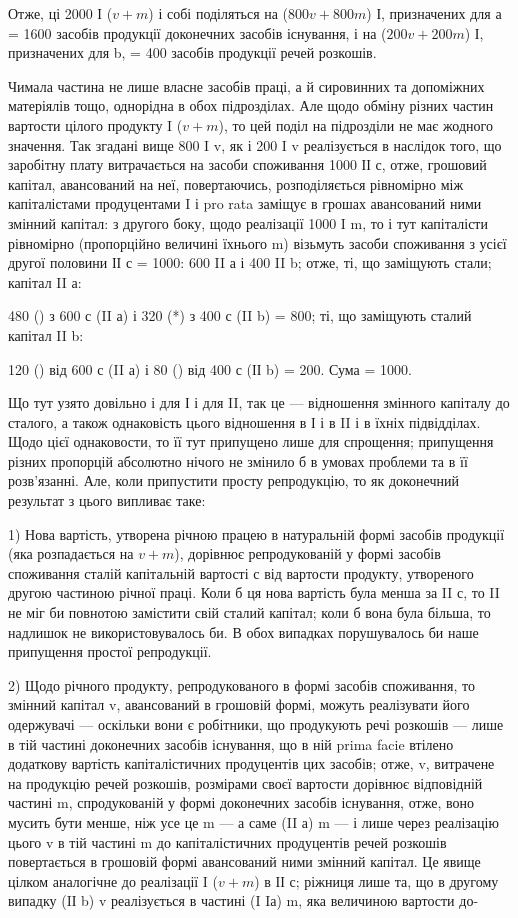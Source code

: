Отже, ці 2000 І ($v + m$) і собі поділяться на ($800 v + 800 m$) І,
призначених для а = 1600 засобів продукції доконечних засобів існування,
і на ($200 v + 200 m$) І, призначених для b, = 400 засобів продукції
речей розкошів.

Чимала частина не лише власне засобів праці, а й сировинних та
допоміжних матеріялів тощо, однорідна в обох підрозділах. Але щодо
обміну різних частин вартости цілого продукту I ($v + m$), то цей поділ
на підрозділи не має жодного значення. Так згадані вище 800 I v, як і
200 I v реалізується в наслідок того, що заробітну плату витрачається
на засоби споживання 1000 ІІ с, отже, грошовий капітал, авансований на
неї, повертаючись, розподіляється рівномірно між капіталістами продуцентами
I і pro rata заміщує в грошах авансований ними змінний капітал:
з другого боку, щодо реалізації 1000 I m, то і тут капіталісти рівномірно
(пропорційно величині їхнього m) візьмуть засоби споживання з
усієї другої половини ІІ с = 1000: 600 II а і 400 II b; отже, ті, що заміщують
стали; капітал II а:

480 () з 600 с (II а) і 320 (*) з 400 с (II b) = 800; ті, що заміщують
сталий капітал II b:

120 () від 600 с (II а) і 80 () від 400 с (ІІ b) = 200. Сума = 1000.

Що тут узято довільно і для І і для II, так це — відношення змінного
капіталу до сталого, а також однаковість цього відношення в
І і в II і в їхніх підвідділах. Щодо цієї однаковости, то її тут припущено
лише для спрощення; припущення різних пропорцій абсолютно нічого
не змінило б в умовах проблеми та в її розв’язанні. Але, коли припустити
просту репродукцію, то як доконечний результат з цього випливає таке:

1) Нова вартість, утворена річною працею в натуральній формі засобів
продукції (яка розпадається на $v + m$), дорівнює репродукованій
у формі засобів споживання сталій капітальній вартості с від вартости
продукту, утвореного другою частиною річної праці. Коли б ця нова вартість
була менша за II с, то II не міг би повнотою замістити свій сталий капітал;
коли б вона була більша, то надлишок не використовувалось би. В
обох випадках порушувалось би наше припущення простої репродукції.

2) Щодо річного продукту, репродукованого в формі засобів споживання,
то змінний капітал v, авансований в грошовій формі, можуть реалізувати
його одержувачі — оскільки вони є робітники, що продукують
речі розкошів — лише в тій частині доконечних засобів існування, що в
ній prima facie втілено додаткову вартість капіталістичних продуцентів
цих засобів; отже, v, витрачене на продукцію речей розкошів, розмірами
своєї вартости дорівнює відповідній частині m, спродукованій у
формі доконечних засобів існування, отже, воно мусить бути менше, ніж
усе це m — а саме (II а) m — і лише через реалізацію цього v в тій частині
m до капіталістичних продуцентів речей розкошів повертається в грошовій
формі авансований ними змінний капітал. Це явище цілком аналогічне
до реалізації I ($v + m$) в ІІ с; ріжниця лише та, що в другому випадку
(IІ b) v реалізується в частині (I Iа) m, яка величиною вартости до-


